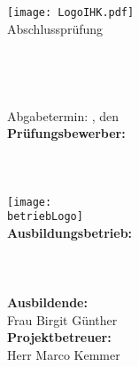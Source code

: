 \begin{titlepage}

\begin{center}
\texttt{[image: LogoIHK.pdf]}\\[1ex]
\Large{Abschlussprüfung \pruefungstermin}\\[3ex]

\Large{\ausbildungsberuf}\\
\LARGE{\betreff}\\[4ex]

\huge{\textbf{\titel}}\\[1.5ex]
\Large{\textbf{\untertitel}}\\[4ex]

\normalsize
Abgabetermin: \abgabeOrt, den \abgabeTermin\\[3em]
\textbf{Prüfungsbewerber:}\\
\autorName\\
\autorAnschrift\\
\autorOrt\\[5ex]

\texttt{[image: \\betriebLogo]}\\[2ex]
\textbf{Ausbildungsbetrieb:}\\
\betriebName\\
\betriebAnschrift\\
\betriebOrt\\[2em]
\textbf{Ausbildende:}\\
Frau Birgit Günther\\[1em]
\textbf{Projektbetreuer:}\\
Herr Marco Kemmer\\
\end{center}

\small
\noindent

\end{titlepage}